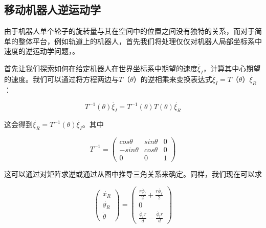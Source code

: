 
\subsection{移动机器人逆运动学}
\label{sec:ivkmobile}
由于机器人单个轮子的旋转量与其在空间中的位置之间没有独特的关系，而对于简单的整体平台，例如轨道上的机器人，首先我们将处理仅仅对机器人局部坐标系中速度的逆运动学问题，。

首先让我们探索如何在给定机器人在世界坐标系中期望的速度$\dot{\xi_I}$，计算其中心期望的速度。我们可以通过将方程两边与$T（\theta）$的逆相乘来变换表达式$\dot{\xi_I}=T（\theta）\dot{\xi_R}$：

\begin{equation}\label{eq:mbik}
T^{-1}(\theta)\dot{\xi_I}=T^{-1}(\theta)T(\theta)\dot{\xi_R}
\end{equation}

这会得到$ \dot{\xi_R}=T^{-1}(\theta)\dot{\xi_I}$。其中

\begin{equation}
T^{-1}=\left(\begin{array}{ccc}cos \theta & sin \theta & 0 \\-sin \theta & cos \theta & 0 \\0 & 0 & 1\end{array}\right)
\end{equation}


这可以通过对矩阵求逆或通过从图中推导三角关系来确定。同样，我们现在可以求

\begin{equation}
\left(\begin{array}{c} \dot{x_R}\\\dot{y_R}\\\dot{\theta}\end{array}\right)=\left(\begin{array}{c}\frac{r\dot{\phi_l}}{2}+\frac{r\dot{\phi_r}}{2}\\0\\\frac{\dot{\phi_r} r}{d}-\frac{\dot{\phi_l} r}{d}\end{array}\right)
\end{equation}

